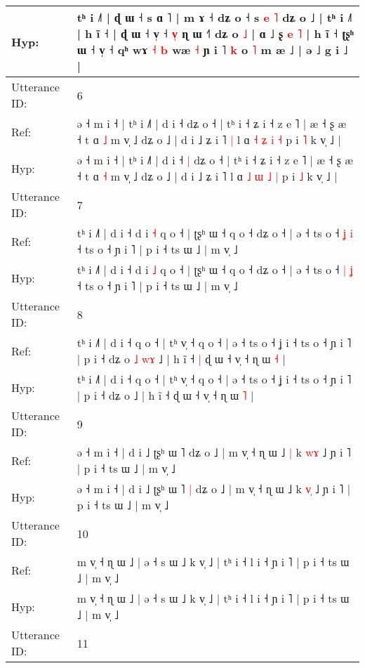 \documentclass[10pt]{article}
\DeclareRobustCommand{\hl}[1]{{\textcolor{red}{#1}}}
\begin{document}
\begin{longtable}{ll}
 \\
Hyp: & tʰ i ˩˥ | ɖ ɯ ˧ s ɑ ˥ | m ɤ ˧ dʑ o ˧ s \hl{e} \hl{˥} dʑ o ˩ | tʰ i ˩˥ | h ĩ ˧ | ɖ ɯ ˧ v̩ ˧\hl{ }\hl{v}\hl{̩} ɳ ɯ ˧\hl{˥} dʑ o \hl{˩} |\hl{}\hl{} ɑ ˩ ʂ \hl{e} \hl{˥} | h ĩ ˧\hl{}\hl{} ʈʂʰ ɯ ˧ v̩ ˧\hl{}\hl{} qʰ wɤ\hl{}\hl{}\hl{} \hl{˧} \hl{b} wæ \hl{˧} ɲ i ˥ \hl{k} o \hl{˥} m æ ˩ | ə ˩ g i ˩ |
 \\
\midrule
Utterance ID: & 6 \\
Ref: & ə ˧ m i ˧ | tʰ i ˩˥ | d i ˧\hl{}\hl{} dʑ o ˧ | tʰ i ˧ ʑ i ˧ z e ˥ | æ ˧ ʂ æ ˧ t ɑ \hl{˩} m v̩ ˩ dʑ o ˩ | d i ˩ ʑ i ˥\hl{ }\hl{|} l ɑ \hl{˧} \hl{ʑ} \hl{i} \hl{˧} p i \hl{˥} k v̩ ˩ |
 \\
Hyp: & ə ˧ m i ˧ | tʰ i ˩˥ | d i ˧\hl{ }\hl{|} dʑ o ˧ | tʰ i ˧ ʑ i ˧ z e ˥ | æ ˧ ʂ æ ˧ t ɑ \hl{˧} m v̩ ˩ dʑ o ˩ | d i ˩ ʑ i ˥\hl{}\hl{} l ɑ \hl{˩} \hl{ɯ} \hl{˩} \hl{|} p i \hl{˩} k v̩ ˩ |
 \\
\midrule
Utterance ID: & 7 \\
Ref: & tʰ i ˩˥ | d i ˧ d i \hl{˧} q o ˧ | ʈʂʰ ɯ ˧ q o ˧ dʑ o ˧ | ə ˧ ts o ˧ \hl{ʝ} \hl{i} ˧ ts o ˧ ɲ i ˥ | p i ˧ ts ɯ ˩ | m v̩ ˩
 \\
Hyp: & tʰ i ˩˥ | d i ˧ d i \hl{˩} q o ˧ | ʈʂʰ ɯ ˧ q o ˧ dʑ o ˧ | ə ˧ ts o ˧ \hl{|} \hl{ʝ} ˧ ts o ˧ ɲ i ˥ | p i ˧ ts ɯ ˩ | m v̩ ˩
 \\
\midrule
Utterance ID: & 8 \\
Ref: & tʰ i ˩˥ | d i ˧ q o ˧ | tʰ v̩ ˧ q o ˧ | ə ˧ ts o ˧ ʝ i ˧ ts o ˧ ɲ i ˥ | p i ˧ dʑ o\hl{ }\hl{˩}\hl{ }\hl{w}\hl{ɤ} ˩ | h ĩ ˧\hl{ }\hl{|} ɖ ɯ ˧ v̩ ˧ ɳ ɯ \hl{˧} |
 \\
Hyp: & tʰ i ˩˥ | d i ˧ q o ˧ | tʰ v̩ ˧ q o ˧ | ə ˧ ts o ˧ ʝ i ˧ ts o ˧ ɲ i ˥ | p i ˧ dʑ o\hl{}\hl{}\hl{}\hl{}\hl{} ˩ | h ĩ ˧\hl{}\hl{} ɖ ɯ ˧ v̩ ˧ ɳ ɯ \hl{˥} |
 \\
\midrule
Utterance ID: & 9 \\
Ref: & ə ˧ m i ˧ | d i ˩ ʈʂʰ ɯ ˥\hl{}\hl{} dʑ o ˩ | m v̩ ˧ ɳ ɯ ˩\hl{ }\hl{|} k \hl{w}\hl{ɤ} ˩ ɲ i ˥ | p i ˧ ts ɯ ˩ | m v̩ ˩
 \\
Hyp: & ə ˧ m i ˧ | d i ˩ ʈʂʰ ɯ ˥\hl{ }\hl{|} dʑ o ˩ | m v̩ ˧ ɳ ɯ ˩\hl{}\hl{} k \hl{v}\hl{̩} ˩ ɲ i ˥ | p i ˧ ts ɯ ˩ | m v̩ ˩
 \\
\midrule
Utterance ID: & 10 \\
Ref: & m v̩ ˧ ɳ ɯ ˩ | ə ˧ s ɯ ˩ k v̩ ˩ | tʰ i ˧ l i ˧ ɲ i ˥ | p i ˧ ts ɯ ˩ | m v̩ ˩
 \\
Hyp: & m v̩ ˧ ɳ ɯ ˩ | ə ˧ s ɯ ˩ k v̩ ˩ | tʰ i ˧ l i ˧ ɲ i ˥ | p i ˧ ts ɯ ˩ | m v̩ ˩
 \\
\midrule
Utterance ID: & 11 \\

\end{longtable}
\end{document}
